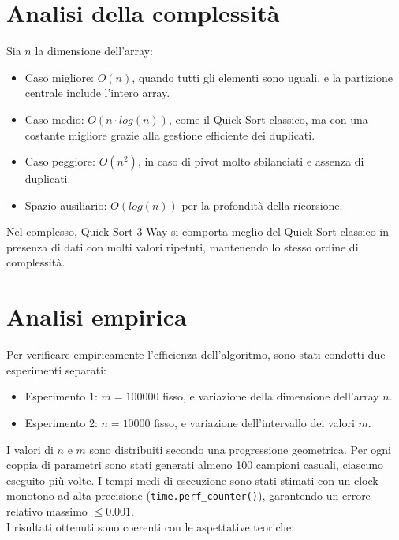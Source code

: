\documentclass[a4paper, 12pt, oneside]{book}
\begin{document}
\section{Analisi della complessità}

Sia \(n\) la dimensione dell'array:

\begin{itemize}
    \item Caso migliore: \(O(n)\), quando tutti gli elementi sono uguali, e la partizione centrale include l'intero array.
    \item Caso medio: \(O(n \cdot log(n))\), come il Quick Sort classico, ma con una costante migliore grazie alla gestione efficiente dei duplicati.
    \item Caso peggiore: \(O(n^2)\), in caso di pivot molto sbilanciati e assenza di duplicati.
    \item Spazio ausiliario: \(O(log(n))\) per la profondità della ricorsione.
\end{itemize}

\noindent Nel complesso, Quick Sort 3-Way si comporta meglio del Quick Sort classico in presenza di dati con molti valori ripetuti, mantenendo lo stesso ordine di complessità.

\section{Analisi empirica}

Per verificare empiricamente l'efficienza dell'algoritmo, sono stati condotti due esperimenti separati:

\begin{itemize}
    \item Esperimento 1: \(m = 100000\) fisso, e variazione della dimensione dell'array \(n\).
    \item Esperimento 2: \(n = 10000\) fisso, e variazione dell'intervallo dei valori \(m\).
\end{itemize}

I valori di \(n\) e \(m\) sono distribuiti secondo una progressione geometrica. Per ogni coppia di parametri sono stati generati almeno 100 campioni casuali, ciascuno eseguito più volte. I tempi medi di esecuzione sono stati stimati con un clock monotono ad alta precisione (\texttt{time.perf\_counter()}), garantendo un errore relativo massimo \(\leq 0.001\). \\

\noindent I risultati ottenuti sono coerenti con le aspettative teoriche:
\end{document}
